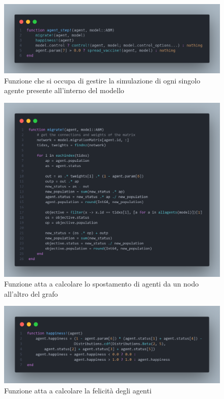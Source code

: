 \begin{figure}[H]
    \begin{center}
		\includegraphics[width=\textwidth]{img/agent_step.png}
		\caption{Funzione che si occupa di gestire la simulazione di ogni singolo agente presente all'interno del modello}
		\label{fig:agent_step}
	\end{center}
\end{figure}

\begin{figure}[H]
    \begin{center}
		\includegraphics[width=\textwidth]{img/migratef.png}
		\caption{Funzione atta a calcolare lo spostamento di agenti da un nodo all'altro del grafo}
		\label{fig:migrationf}
	\end{center}
\end{figure}

\begin{figure}[H]
    \begin{center}
		\includegraphics[width=\textwidth]{img/happiness.png}
		\caption{Funzione atta a calcolare la felicità degli agenti}
		\label{fig:happinessf}
	\end{center}
\end{figure}

